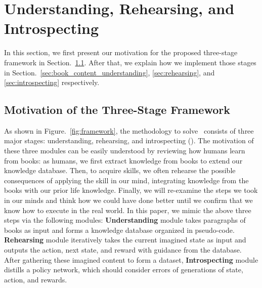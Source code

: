 



% 

\vspace{-1mm}
\section{Understanding, Rehearsing, and Introspecting}
\vspace{-1mm}

In this section, we first present our motivation for the proposed three-stage framework in Section.~\ref{sec:framework}. After that, we explain how we implement those stages in Section.~\ref{sec:book_content_understanding}, \ref{sec:rehearsing}, and \ref{sec:introspecting} respectively.


\vspace{-1mm}
\subsection{Motivation of the Three-Stage Framework}
\label{sec:framework}
\vspace{-1mm}

As shown in Figure.~\ref{fig:framework}, the methodology to solve \topic~consists of three major stages: understanding, rehearsing, and introspecting (\algo). The motivation of these three modules can be easily understood by reviewing how humans learn from books: as humans, we first extract knowledge from books to extend our knowledge database. Then, to acquire skills,  we often rehearse the possible consequences of applying the skill in our mind, integrating knowledge from the books with our prior life knowledge. Finally, we will re-examine the steps we took in our minds and think how we could have done better until we confirm that we know how to execute in the real world. In this paper, we mimic the above three steps via the following modules: \textbf{Understanding} module takes paragraphs of books as input and forms a knowledge database organized in pseudo-code. \textbf{Rehearsing} module iteratively takes the current imagined state as input and outputs the action, next state, and reward with guidance from the database. After gathering these imagined content to form a dataset, \textbf{Introspecting} module distills a policy network, which should consider errors of generations of state, action, and rewards. 

